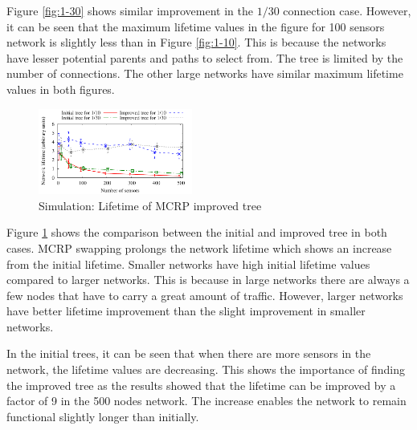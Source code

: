 Figure \ref{fig:1-30} shows similar improvement in the $1/30$ connection case. However, it can be seen that the maximum lifetime values in the figure for 100 sensors network is slightly less than in Figure \ref{fig:1-10}. This is because the networks have lesser potential parents and paths to select from. The tree is limited by the number of connections. The other large networks have similar maximum lifetime values in both figures.

\begin{figure}
\centering
\includegraphics[width=0.45\textwidth]{figures/maxmin.pdf}
\caption{Simulation: Lifetime of MCRP improved tree}
\label{fig:nodes-maxmin}
\end{figure}

Figure \ref{fig:nodes-maxmin} shows the comparison between the initial and improved tree in both cases. MCRP swapping prolongs the network lifetime which shows an increase from the initial lifetime. Smaller networks have high initial lifetime values compared to larger networks.  This is because in large networks there are always a few nodes that have to carry a great amount of traffic.  However, larger networks have better lifetime improvement than the slight improvement in smaller networks.

In the initial trees, it can be seen that when there are more sensors in the network, the lifetime values are decreasing. This shows the importance of finding the improved tree as the results showed that the lifetime can be improved by a factor of 9 in the 500 nodes network.
The increase enables the network to remain functional slightly longer than initially. 

